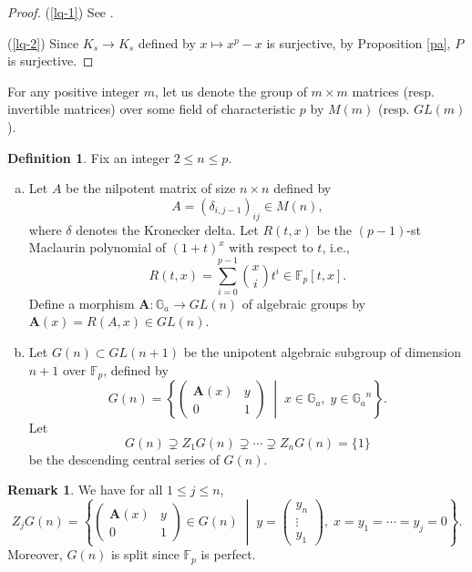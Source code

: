 \documentclass[10pt,a4paper]{amsart}
\numberwithin{equation}{section}
\theoremstyle{plain}
\theoremstyle{definition}
\newtheorem{defi}[theo]{Definition}
\newtheorem{rema}[theo]{Remark}
\begin{document}
\begin{proof}
  (\ref{lq-1}) See \cite{Ng}.




(\ref{lq-2}) Since $K_s\to K_s$ defined by $x\mapsto x^p-x$ is surjective, by Proposition \ref{pa}, $P$ is surjective.
\end{proof}
For any positive integer $m$, let us denote the group of $m\times m$ matrices (resp. invertible matrices) over some field of characteristic $p$ by $M(m)$ (resp. $GL(m)$). 
\begin{defi}\label{dfb}
  Fix an integer $2\leq n\leq p$.
  \begin{enumerate}[(a)]
    \item\label{dfb-1} Let $A$ be the nilpotent matrix of size $n\times n$ defined by
\begin{equation}
A=\left(\delta_{i,j-1}\right)_{ij}\in M(n),
\end{equation}
where $\delta$ denotes the Kronecker delta. Let $R(t,x)$ be the $(p-1)$-st Maclaurin polynomial of $(1+t)^x$ with respect to $t$, i.e.,
\begin{equation}
R(t,x)=\sum_{i=0}^{p-1}\binom{x}{i}t^i\in\mathbb{F}_p[t,x].
\end{equation}
Define a morphism $\mathbf{A}:\mathbb{G}_a\to GL(n)$ of algebraic groups by $\mathbf{A}(x)=R(A,x)\in GL(n)$.
\item\label{dfb-2}
Let $G(n)\subset GL(n+1)$ be the unipotent algebraic subgroup of dimension $n+1$ over $\mathbb{F}_p$, defined by
\begin{equation}
G(n)=\left\{
\begin{pmatrix}
  \mathbf{A}(x)&y\\
  0&1
\end{pmatrix}\;
\middle|\;x\in \mathbb{G}_a,\;y\in {\mathbb{G}_a}^n\right\}.
\end{equation}
Let
\begin{equation}
G(n)\supsetneq Z_1G(n)\supsetneq\cdots\supsetneq Z_nG(n)=\{1\}
\end{equation}
be the descending central series of $G(n)$.
\end{enumerate}
\end{defi}

\begin{rema}
We have for all $1\leq j\leq n$, 
\begin{equation}
Z_jG(n)=\left\{
  \begin{pmatrix}
  \mathbf{A}(x)&y\\
  0&1
  \end{pmatrix}\in G(n)\;\middle|
  \;y=\begin{pmatrix}
  y_n\\
  \vdots\\
  y_1
  \end{pmatrix},\;
  x=y_1=\cdots=y_j=0
\right\}.
\end{equation}
Moreover, $G(n)$ is split since $\mathbb{F}_p$ is perfect.
\end{rema}
\end{document}
